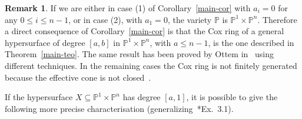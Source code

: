 \documentclass{amsart}
\theoremstyle{definition}
\newtheorem{remark}[theorem]{Remark}
\theoremstyle{remark}
\begin{document}
\begin{remark}
    \label{rem:P1n}
If we are either in case (1) of Corollary~\ref{main-cor} with $a_i=0$ for
any $0\leq i\leq n-1$, or in case (2), with $a_1=0$, the variety $\mathbb P$ is
$\mathbb P^1\times \mathbb P^n$. Therefore
a direct consequence of Corollary~\ref{main-cor}
is that the Cox ring of a general hypersurface
of degree $[a,b]$ in $\mathbb P^1\times
\mathbb P^n$, with $a\leq n-1$,
is the one described in
Theorem~\ref{main-teo}.
The same result has been proved
by Ottem in~\cite[Thm.~1.1]{ott} using different techniques.
In the remaining cases the Cox ring is not
finitely generated because the effective cone
is not closed~\cite[Thm.~5.6]{ott}.

If the hypersurface $X\subseteq\mathbb P^1
\times\mathbb P^n$ has degree $[a,1]$, it is
possible to give the following
more precise characterisation
(generalizing~\cite{ott}*{Ex.~3.1}).
\end{remark}
\end{document}
